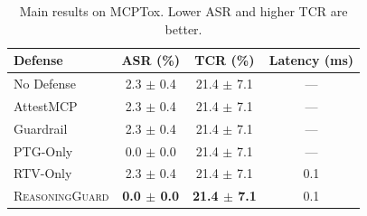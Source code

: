 \begin{table}[t]
\centering
\small
\begin{tabular}{lccc}
\toprule
Defense & ASR (\%) & TCR (\%) & Latency (ms) \\
\midrule
No Defense & 2.3 $\pm$ 0.4 & 21.4 $\pm$ 7.1 & --- \\
AttestMCP & 2.3 $\pm$ 0.4 & 21.4 $\pm$ 7.1 & --- \\
Guardrail & 2.3 $\pm$ 0.4 & 21.4 $\pm$ 7.1 & --- \\
PTG-Only & 0.0 $\pm$ 0.0 & 21.4 $\pm$ 7.1 & --- \\
RTV-Only & 2.3 $\pm$ 0.4 & 21.4 $\pm$ 7.1 & 0.1 \\
\textsc{ReasoningGuard} & \textbf{0.0 $\pm$ 0.0} & \textbf{21.4 $\pm$ 7.1} & 0.1 \\
\bottomrule
\end{tabular}
\caption{Main results on MCPTox. Lower ASR and higher TCR are better.}
\label{tab:main}
\end{table}
